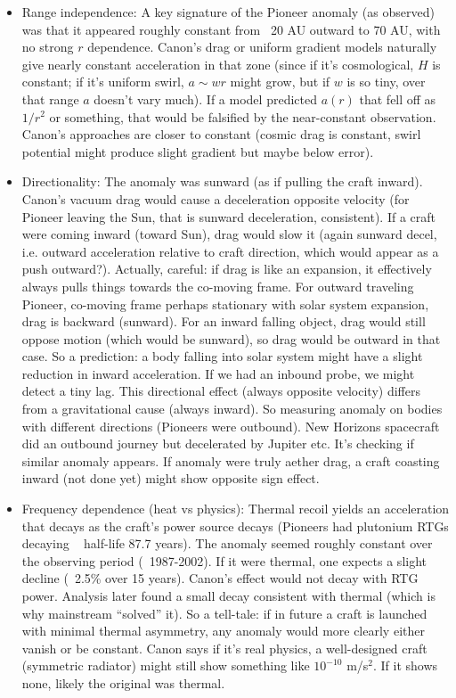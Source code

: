 \documentclass[11pt]{article}
\begin{document}
\begin{itemize}

\item 
Range independence: A key signature of the Pioneer anomaly (as observed) was that it appeared roughly constant from ~20 AU outward to 70 AU, with no strong $r$ dependence. Canon’s drag or uniform gradient models naturally give nearly constant acceleration in that zone (since if it’s cosmological, $H$ is constant; if it’s uniform swirl, $a \sim w r$ might grow, but if $w$ is so tiny, over that range $a$ doesn’t vary much). If a model predicted $a(r)$ that fell off as $1/r^2$ or something, that would be falsified by the near-constant observation. Canon’s approaches are closer to constant (cosmic drag is constant, swirl potential might produce slight gradient but maybe below error).




\item 
Directionality: The anomaly was sunward (as if pulling the craft inward). Canon’s vacuum drag would cause a deceleration opposite velocity (for Pioneer leaving the Sun, that is sunward deceleration, consistent). If a craft were coming inward (toward Sun), drag would slow it (again sunward decel, i.e. outward acceleration relative to craft direction, which would appear as a push outward?). Actually, careful: if drag is like an expansion, it effectively always pulls things towards the co-moving frame. For outward traveling Pioneer, co-moving frame perhaps stationary with solar system expansion, drag is backward (sunward). For an inward falling object, drag would still oppose motion (which would be sunward), so drag would be outward in that case. So a prediction: a body falling into solar system might have a slight reduction in inward acceleration. If we had an inbound probe, we might detect a tiny lag. This directional effect (always opposite velocity) differs from a gravitational cause (always inward). So measuring anomaly on bodies with different directions (Pioneers were outbound). New Horizons spacecraft did an outbound journey but decelerated by Jupiter etc. It's checking if similar anomaly appears. If anomaly were truly aether drag, a craft coasting inward (not done yet) might show opposite sign effect.




\item 
Frequency dependence (heat vs physics): Thermal recoil yields an acceleration that decays as the craft’s power source decays (Pioneers had plutonium RTGs decaying ~ half-life 87.7 years). The anomaly seemed roughly constant over the observing period (~1987-2002). If it were thermal, one expects a slight decline (~2.5\% over 15 years). Canon’s effect would not decay with RTG power. Analysis later found a small decay consistent with thermal (which is why mainstream “solved” it). So a tell-tale: if in future a craft is launched with minimal thermal asymmetry, any anomaly would more clearly either vanish or be constant. Canon says if it’s real physics, a well-designed craft (symmetric radiator) might still show something like $10^{-10}$ m/s$^2$. If it shows none, likely the original was thermal.





\end{itemize}
\end{document}
